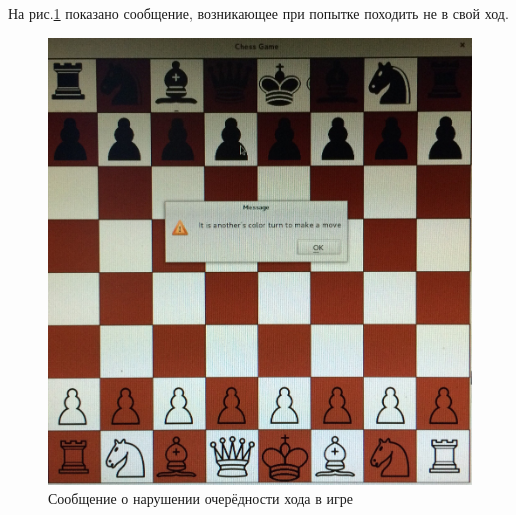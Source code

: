 На рис.\ref{pic:GUIwrongMoveMessege} показано сообщение, возникающее при попытке походить не в свой ход.\\
\begin{figure}[H]
	\begin{center}
		\includegraphics[scale=0.1]{pics/gui2.jpg}
		\caption{Сообщение о нарушении очерёдности хода в игре} 
		\label{pic:GUIwrongMoveMessege} %
	\end{center}
\end{figure}

